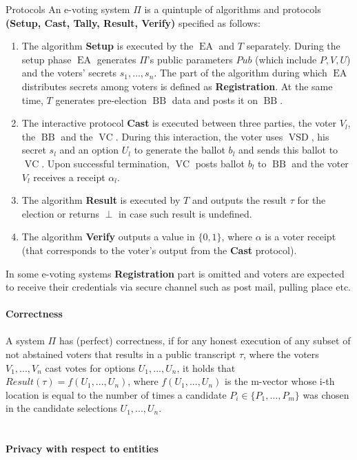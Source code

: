 \documentclass[12pt]{article}
\DeclareMathOperator{\vsd}{VSD}
\DeclareMathOperator{\ea}{EA}
\DeclareMathOperator{\bb}{BB}
\DeclareMathOperator{\voc}{VC}
\begin{document}
Protocols
An e-voting system $\Pi$ is a quintuple of algorithms and protocols  \textbf{(Setup, Cast, Tally, Result, Verify)} specified as follows:
\begin{enumerate}
\item The algorithm \textbf{Setup} is executed by the $\ea$ and $T$ separately. During the setup phase $\ea$ generates $\Pi$'s public parameters $Pub$ (which include $P, V, U$) and the voters' secrets $s_1, \dots , s_n$. The part of the algorithm during which $\ea$ distributes secrets among voters is defined as \textbf{Registration}. At the same time, $T$ generates pre-election $\bb$ data and posts it on $\bb$.
\item The interactive protocol \textbf{Cast} is executed between three parties, the voter $V_l$, the $\bb$ and the $\voc$. During this interaction, the voter uses $\vsd$, his secret $s_l$ and an option $U_l$ to generate the ballot $b_l$ and sends this ballot to $\voc$. Upon successful termination, $\voc$ posts ballot $b_l$ to $\bb$ and the voter $V_l$ receives a receipt $\alpha_l$.
\item The algorithm \textbf{Result} is executed by $T$ and outputs the result $\tau$ for the election or returns $\perp$ in case such result is undefined.
\item  The algorithm \textbf{Verify} outputs a value in $\{0,1\}$, where  $\alpha$ is a voter receipt (that corresponds to the voter's output from the \textbf{Cast} protocol).
\end{enumerate}
In some e-voting systems \textbf{Registration} part is omitted and voters are expected to receive their credentials via secure channel such as post mail, pulling place etc.\\\\
{\textbf{\large{Correctness}}}\\\\
A system $\Pi$ has (perfect) correctness, if for any honest execution of any subset of not abstained voters that results in a public transcript $\tau$, where the voters $V_1, . . . , V_n$ cast votes for options $U_1, . . . , U_n$, it holds that $Result(\tau) = f(U_1,...,U_n)$, where $f(U_1,...,U_n)$ is the m-vector whose i-th location is equal to the number of times a candidate $P_i \in \{P_1,\dots, P_m\}$ was chosen in the candidate selections $U_1, . . . , U_n$.\\\\\\
{\textbf{\large{Privacy with respect to entities}}}\\\\
\end{document}
